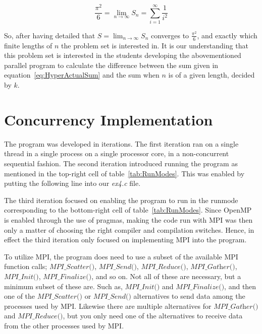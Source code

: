 \documentclass[fontsize=11pt,paper=a4,titlepage]{report}
\begin{document}
\begin{equation}
	\frac{\pi^2}{6} = \lim_{n \to \infty}S_n = \sum_{i=1}^{\infty} \frac{1}{i^2}
	\label{eq:HyperActualSum}
\end{equation}

So, after having detailed that $S = \lim_{n \to \infty}S_n$ converges to $\frac{
\pi^2}{6}$, and exactly which finite lengths of $n$ the problem set is
interested in. It is our understanding that this problem set is interested in
the students developing the abovementioned parallel program to calculate the
difference between the sum given in equation~\ref{eq:HyperActualSum} and the sum
when $n$ is of a given length, decided by $k$.

\section{Concurrency Implementation}

The program was developed in iterations. The first iteration ran on a single
thread in a single process on a single processor core, in a non-concurrent
sequential fashion. The second iteration introduced running the program as
mentioned in the top-right cell of table~\ref{tab:RunModes}. This was enabled by
putting the following line into our \textit{ex4.c} file.



The third iteration focused on enabling the program to run in the runmode
corresponding to the bottom-right cell of table~\ref{tab:RunModes}.
Since OpenMP is enabled through the use of pragmas, making the code run with MPI
was then only a matter of choosing the right compiler and compilation switches.
Hence, in effect the third iteration only focused on implementing MPI into the
program.

To utilize MPI, the program does need to use a subset of the available MPI
function calls; $\textit{MPI\_Scatter()}$, $\textit{MPI\_Send()}$,
$\textit{MPI\_Reduce()}$, $\textit{MPI\_Gather()}$, $\textit{MPI\_Init()}$,
$\textit{MPI\_Finalize()}$, and so on. Not all of these are necessary, but a
minimum subset of these are. Such as, $\textit{MPI\_Init()}$ and $\textit{
MPI\_Finalize()}$, and then one of the $\textit{MPI\_Scatter()}$ or
$\textit{MPI\_Send()}$ alternatives to send data among the processes used by
MPI. Likewise there are multiple alternatives for $\textit{MPI\_Gather()}$ and
$\textit{MPI\_Reduce()}$, but you only need one of the alternatives to receive
data from the other processes used by MPI.
\end{document}

